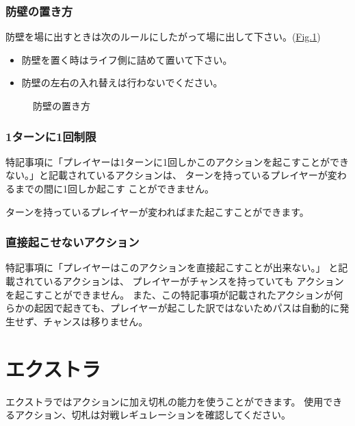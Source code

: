 \documentclass[letterpaper,10pt,dvipdfmx]{sphinxmanual}
\begin{document}
\subsubsection{防壁の置き方}
\label{\detokenize{common/common:id31}}
\sphinxAtStartPar
防壁を場に出すときは次のルールにしたがって場に出して下さい。(\hyperref[\detokenize{common/common:set-bulwork}]{Fig.\@ \ref{\detokenize{common/common:set-bulwork}}})
\begin{itemize}
\item {} 
\sphinxAtStartPar
防壁を置く時はライフ側に詰めて置いて下さい。

\item {} 
\sphinxAtStartPar
防壁の左右の入れ替えは行わないでください。

\end{itemize}

\begin{figure}[htbp]
\centering
\capstart

\noindent{}
\caption{防壁の置き方}\label{\detokenize{common/common:id57}}\label{\detokenize{common/common:set-bulwork}}\end{figure}


\subsubsection{1ターンに1回制限}
\label{\detokenize{common/common:id32}}
\sphinxAtStartPar
特記事項に「プレイヤーは1ターンに1回しかこのアクションを起こすことができない。」と記載されているアクションは、
ターンを持っているプレイヤーが変わるまでの間に1回しか起こす
ことができません。

\sphinxAtStartPar
ターンを持っているプレイヤーが変わればまた起こすことができます。


\subsubsection{直接起こせないアクション}
\label{\detokenize{common/common:id33}}
\sphinxAtStartPar
特記事項に「プレイヤーはこのアクションを直接起こすことが出来ない。」
と記載されているアクションは、
プレイヤーがチャンスを持っていても
アクションを起こすことができません。
また、この特記事項が記載されたアクションが何らかの起因で起きても、プレイヤーが起こした訳ではないためパスは自動的に発生せず、チャンスは移りません。

\ignorespaces 

\section{エクストラ}
\label{\detokenize{common/common:extra}}\label{\detokenize{common/common:index-22}}\label{\detokenize{common/common:id34}}
\sphinxAtStartPar
エクストラではアクションに加え切札の能力を使うことができます。
使用できるアクション、切札は対戦レギュレーションを確認してください。
\end{document}
